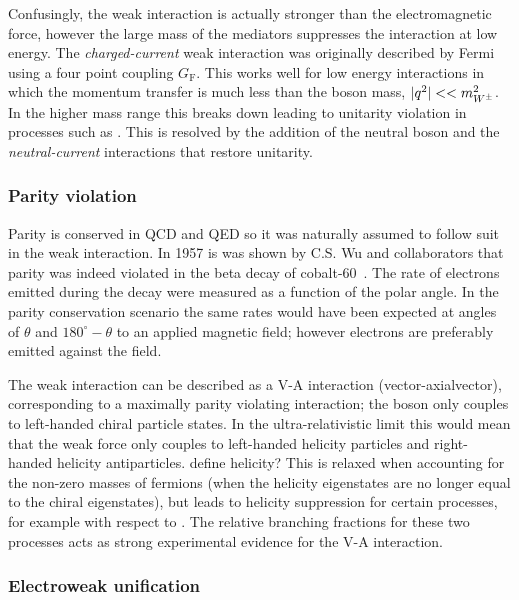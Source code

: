 Confusingly, the weak interaction is actually stronger than the electromagnetic force, however the large mass of the mediators suppresses the interaction at low energy.
The \emph{charged-current} weak interaction was originally described by Fermi using a four point coupling $G_{\text{F}}$. 
This works well for low energy interactions in which the momentum transfer is much less than the \Wpm boson mass, $|q^{2}|<<m_{W^\pm}^2$. In the higher mass range this breaks down leading to unitarity violation in processes such as \decay{\ep\en}{\Wp\Wm}. This is resolved by the addition of the neutral \Z boson and the \emph{neutral-current} interactions that restore unitarity. 


\subsubsection{Parity violation}
Parity is conserved in QCD and QED so it was naturally assumed to follow suit in the weak interaction. In 1957 is was shown by C.S. Wu and collaborators that parity was indeed violated in the beta decay of cobalt-60~\cite{PhysRev.105.1413}. The rate of electrons emitted during the decay were measured as a function of the polar angle. In the parity conservation scenario the same rates would have been expected at angles of $\theta$ and $180^\circ-\theta$ to an applied magnetic field; however electrons are preferably emitted against the field.          

The weak interaction can be described as a V-A interaction (vector-axialvector), corresponding to a maximally parity violating interaction; the \Wpm boson only couples to left-handed chiral particle states. In the ultra-relativistic limit this would mean that the weak force only couples to left-handed helicity particles and right-handed helicity antiparticles. {\color{Red} define helicity?} This is relaxed when accounting for the non-zero masses of fermions (when the helicity eigenstates are no longer equal to the chiral eigenstates), but leads to helicity suppression for certain processes, for example \decay{\pim}{\en\neueb} with respect to \decay{\pim}{\mun\neumb}. The relative branching fractions for these two processes acts as strong experimental evidence for the V-A interaction.

\subsubsection{Electroweak unification}

